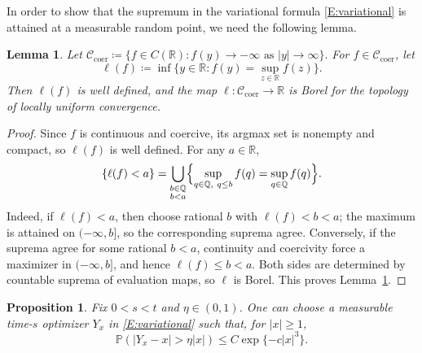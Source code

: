 \documentclass[12pt, reqno]{amsart}
\numberwithin{equation}{section}
\newtheorem{lemma}[theorem]{Lemma}
\newtheorem{proposition}[theorem]{Proposition}
\theoremstyle{definition}
\newcommand{\R}{\mathbb{R}}
\newcommand{\Prob}{\mathbb{P}}
\begin{document}
In order to show that the supremum in the variational formula
\eqref{E:variational} is attained at a measurable random point, we need the
following lemma. 

\begin{lemma}\label{L:borel-leftmost-argmax}
  Let
  $
    \mathcal{C}_{\mathrm{coer}}
     \coloneqq \{f\in C(\R): f(y)\to-\infty \text{ as } |y|\to\infty\}.
  $
  For $f\in\mathcal{C}_{\mathrm{coer}}$, let
  \[
    \ell(f) \coloneqq \inf\{y\in\R: f(y)=\sup_{z\in\R} f(z)\}.
  \]
  Then $\ell(f)$ is well defined, and the map $\ell:\mathcal{C}_{\mathrm{coer}}\to\R$
  is Borel for the topology of locally uniform convergence.
\end{lemma}

\begin{proof}
  Since $f$ is continuous and coercive, its argmax set is nonempty and compact,
  so $\ell(f)$ is well defined. For any $a \in \R$,
  \[
    \{\ell(f)<a\}
    =
    \bigcup_{\substack{b\in\mathbb{Q}\\ b<a}}
    \Bigl\{\sup_{q\in\mathbb{Q},\ q\le b} f(q)
    =\sup_{q\in\mathbb{Q}} f(q)\Bigr\}.
  \]
  Indeed, if $\ell(f)<a$, then choose rational $b$ with $\ell(f)<b<a$; the
  maximum is attained on $(-\infty,b]$, so the corresponding suprema agree.
  Conversely, if the suprema agree for some rational $b<a$, continuity and
  coercivity force a maximizer in $(-\infty,b]$, and hence $\ell(f)\le b<a$.
  Both sides are determined by countable suprema of evaluation maps, so $\ell$
  is Borel.  This proves Lemma~\ref{L:borel-leftmost-argmax}.
\end{proof}

\begin{proposition}\label{P:flat-to-point-geodesic-localization}
  Fix $0<s<t$ and $\eta \in (0,1)$. One can choose a measurable time-$s$
  optimizer $Y_x$ in \eqref{E:variational} such that, for $|x| \ge 1$,
  \begin{equation}
    \Prob(|Y_x-x|>\eta |x|)
    \le C\exp\{-c |x|^3\}.
    \label{E:proved-geodesic-localization}
  \end{equation}
\end{proposition}
\end{document}
